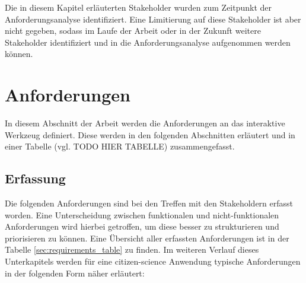 Die in diesem Kapitel erläuterten Stakeholder wurden zum Zeitpunkt der Anforderungsanalyse identifiziert. Eine Limitierung auf diese Stakeholder ist aber nicht gegeben, sodass im Laufe der Arbeit oder in der Zukunft weitere Stakeholder identifiziert und in die Anforderungsanalyse aufgenommen werden können.

\section{Anforderungen}
In diesem Abschnitt der Arbeit werden die Anforderungen an das interaktive Werkzeug definiert. Diese werden in den folgenden Abschnitten erläutert und in einer Tabelle (vgl. TODO HIER TABELLE) zusammengefasst.

\subsection{Erfassung}
Die folgenden Anforderungen sind bei den Treffen mit den Stakeholdern erfasst worden. Eine Unterscheidung zwischen funktionalen und nicht-funktionalen Anforderungen wird hierbei getroffen, um diese besser zu strukturieren und priorisieren zu können. Eine Übersicht aller erfassten Anforderungen ist in der Tabelle \ref{sec:requirements_table} zu finden. Im weiteren Verlauf dieses Unterkapitels werden für eine citizen-science Anwendung typische Anforderungen in der folgenden Form näher erläutert:

